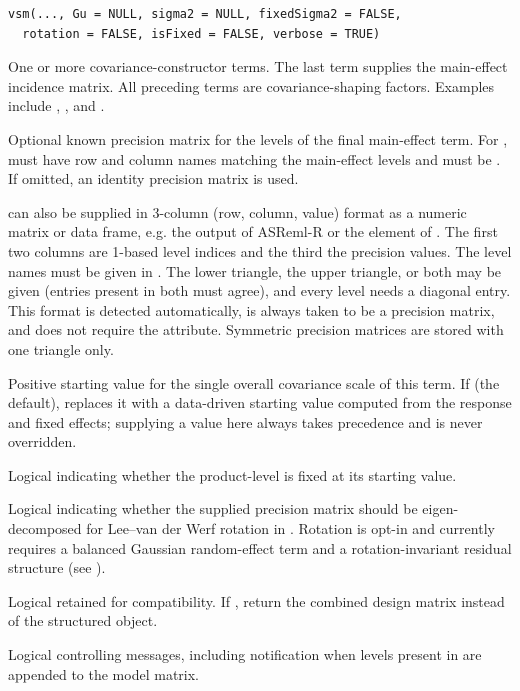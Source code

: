 \documentclass[a4paper]{book}
\begin{document}
%
\begin{Usage}
\begin{verbatim}
vsm(..., Gu = NULL, sigma2 = NULL, fixedSigma2 = FALSE,
  rotation = FALSE, isFixed = FALSE, verbose = TRUE)
\end{verbatim}
\end{Usage}
%
\begin{Arguments}
\begin{ldescription}
\item[\code{...}] One or more covariance-constructor terms.  The last term supplies
the main-effect incidence matrix.  All preceding terms are covariance-shaping
factors.  Examples include , , and
.
\item[\code{Gu}] Optional known precision matrix for the levels of the final
main-effect term. For ,  must have row and column
names matching the main-effect levels and  must be
. If omitted, an identity precision matrix is used.

 can also be supplied in 3-column (row, column, value) format as a
numeric matrix or data frame, e.g. the output of ASReml-R 
or the  element of . The first two
columns are 1-based level indices and the third the precision values. The
level names must be given in . The lower
triangle, the upper triangle, or both may be given (entries present in both
must agree), and every level needs a diagonal entry. This format is detected
automatically, is always taken to be a precision matrix, and does not require
the  attribute. Symmetric precision matrices are stored with
one triangle only.
\item[\code{sigma2}] Positive starting value for the single overall covariance
scale of this  term. If  (the default), 
replaces it with a data-driven starting value computed from the response
and fixed effects; supplying a value here always takes precedence and is
never overridden.
\item[\code{fixedSigma2}] Logical indicating whether the product-level
 is fixed at its starting value.
\item[\code{rotation}] Logical indicating whether the supplied  precision
matrix should be eigen-decomposed for Lee--van der Werf rotation in
. Rotation is opt-in and currently requires a balanced Gaussian
random-effect term and a rotation-invariant residual structure (see
).
\item[\code{isFixed}] Logical retained for compatibility.  If , return
the combined design matrix instead of the structured  object.
\item[\code{verbose}] Logical controlling messages, including notification when
levels present in  are appended to the model matrix.
\end{ldescription}
\end{Arguments}
\end{document}
